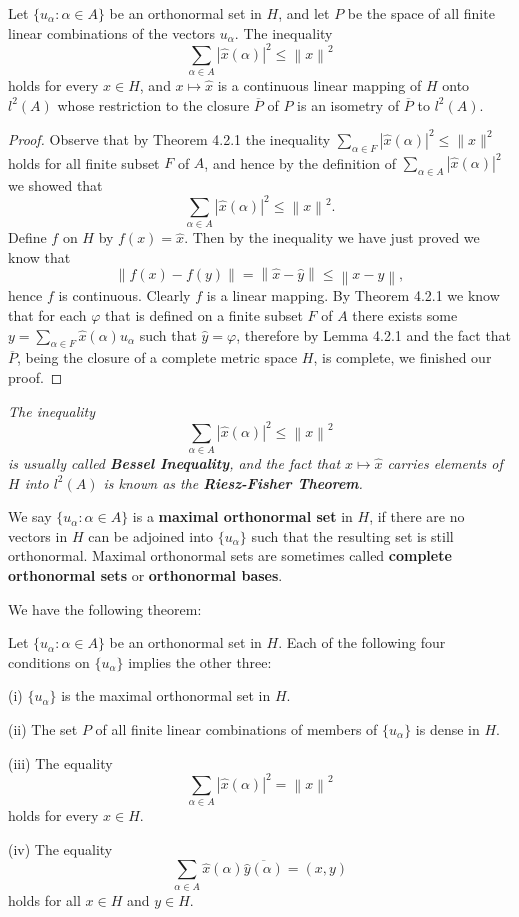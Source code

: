 \begin{theorem}
Let $\{u_\alpha:\alpha\in A\}$ be an orthonormal set in $H$, and let $P$ be the space of all finite linear combinations of the vectors $u_\alpha$. The inequality 
$$
\sum_{\alpha \in A}{\left| \widehat{x}\left( \alpha \right) \right|^2}\le \left\| x \right\| ^2
$$
holds for every $x\in H$, and $x\mapsto\widehat{x}$ is a continuous linear mapping of $H$ onto $l^2(A)$ whose restriction to the closure $\overline{P}$ of $P$ is an isometry of $\overline{P}$ to $l^2(A)$.
\end{theorem}
\begin{proof}
Observe that by Theorem 4.2.1 the inequality $\sum_{\alpha\in F}|\widehat{x}(\alpha)|^2\le\|x\|^2$ holds for all finite subset $F$ of $A$, and hence by the definition of $\sum_{\alpha\in A}|\widehat{x}(\alpha)|^2$ we showed that 
$$
\sum_{\alpha \in A}{\left| \widehat{x}\left( \alpha \right) \right|^2}\le \left\| x \right\| ^2.
$$
Define $f$ on $H$ by $f(x)=\widehat{x}$. Then by the inequality we have just proved we know that 
$$
\left\| f\left( x \right) -f\left( y \right) \right\| =\left\| \widehat{x}-\widehat{y} \right\| \le \left\| x-y \right\| ,
$$
hence $f$ is continuous. Clearly $f$ is a linear mapping. By Theorem 4.2.1 we know that for each $\varphi$ that is defined on a finite subset $F$ of $A$ there exists some $y=\sum_{\alpha\in F}\widehat{x}(\alpha)u_\alpha$ such that $\widehat{y}=\varphi$, therefore by Lemma 4.2.1 and the fact that $\overline{P}$, being the closure of a complete metric space $H$, is complete, we finished our proof. 
\end{proof}
\begin{note}\em
The inequality 
$$
\sum_{\alpha \in A}{\left| \widehat{x}\left( \alpha \right) \right|^2}\le \left\| x \right\| ^2
$$
is usually called \textbf{Bessel Inequality}, and the fact that $x\mapsto\widehat{x}$ carries elements of $H$ into $l^2(A)$ is known as the \textbf{Riesz-Fisher Theorem}.
\end{note}
We say $\{u_\alpha:\alpha\in A\}$ is a \textbf{maximal orthonormal set} in $H$, if there are no vectors in $H$ can be adjoined into $\{u_\alpha\}$ such that the resulting set is still orthonormal. Maximal orthonormal sets are sometimes called \textbf{complete orthonormal sets} or \textbf{orthonormal bases}.\par
We have the following theorem: 
\begin{theorem}
Let $\{u_\alpha:\alpha\in A\}$ be an orthonormal set in $H$. Each of the following four conditions on $\{u_\alpha\}$ implies the other three:\par
(i) $\{u_\alpha\}$ is the maximal orthonormal set in $H$.\par
(ii) The set $P$ of all finite linear combinations of members of $\{u_\alpha\}$ is dense in $H$.\par
(iii) The equality 
$$
\sum_{\alpha \in A}{\left| \widehat{x}\left( \alpha \right) \right|^2}=\left\| x \right\| ^2
$$
holds for every $x\in H$.\par
(iv) The equality 
$$
\sum_{\alpha \in A}{\widehat{x}\left( \alpha \right) \overline{\widehat{y}\left( \alpha \right) }}=\left( x,y \right) 
$$
holds for all $x\in H$ and $y\in H$.
\end{theorem}

